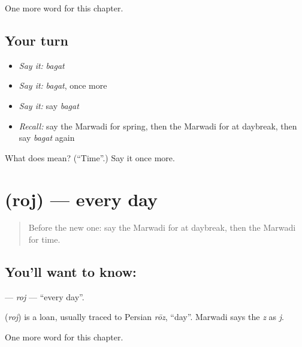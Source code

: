 \begin{grammarlens}[title={What you've built}]
One more word for this chapter.
\end{grammarlens}

\subsection*{Your turn}
\begin{itemize}
\raggedright
  \item \emph{Say it:} \emph{bagat}
  \item \emph{Say it:} \emph{bagat}, once more
  \item \emph{Say it:} say \emph{bagat}
  \item \emph{Recall:} say the Marwadi for spring, then the Marwadi for at daybreak, then say \emph{bagat} again
\end{itemize}

\begin{tcolorbox}[breakable,colback=teal!4,colframe=teal!35!black,title={Before you move on}]
What does  mean? (\textquotedblleft{}Time\textquotedblright{}.) Say it once more.
\end{tcolorbox}
\section[\texorpdfstring{\mw{रोज} (roj)}{रोज (roj)}]{ (roj) — every day}

\label{lesson:MW-C95-roj}



\begin{quote}
Before the new one: say the Marwadi for at daybreak, then the Marwadi for time.
\end{quote}

\subsection*{You'll want to know: }
\textbf{} — \emph{roj} — \textquotedblleft{}every day\textquotedblright{}.

\begin{cousinweb}
\textbf{} (\emph{roj}) is a loan, usually traced to Persian \emph{rōz}, \textquotedblleft{}day\textquotedblright{}. Marwadi says the \emph{z} as \emph{j}.
\end{cousinweb}

\begin{grammarlens}[title={What you've built}]
One more word for this chapter.
\end{grammarlens}

